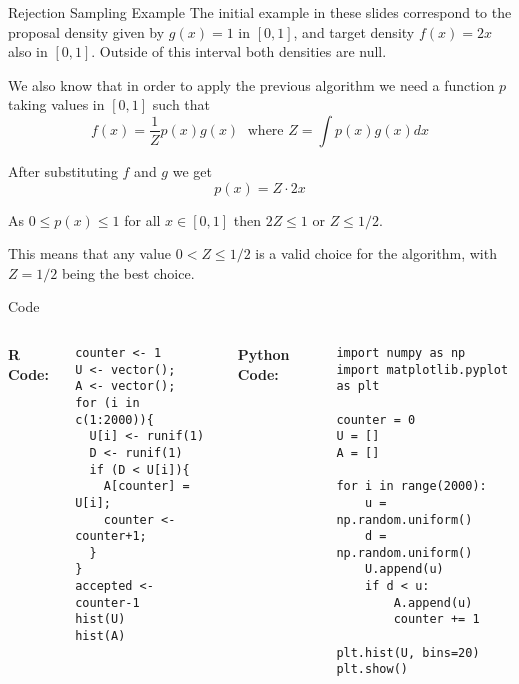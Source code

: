 \documentclass[8pt]{beamer}
\begin{document}
\begin{frame}{Rejection Sampling Example}
The initial example in these slides correspond to the proposal density given by $g(x)=1$ in $[0,1]$, and target density $f(x)=2x$ also in $[0,1]$. Outside of this interval both densities are null.

\vspace{2mm} 

We also know that in order to apply the previous algorithm we need a function $p$ taking values in $[0,1]$ such that 
\begin{equation*}
f(x)=\frac{1}{Z}p(x)g(x)  \; \text{ where } Z=\int p(x) g(x) dx
\end{equation*}

After substituting $f$ and $g$ we get
\begin{equation*}
p(x)=Z\cdot2x
\end{equation*}

As $0\leq p(x) \leq 1$ for all $x \in [0,1]$ then $2Z \leq 1$ or $Z \leq 1/2$.

\vspace{2mm}

This means that any value $0<Z\leq 1/2$ is a valid choice for the algorithm, with $Z=1/2$ being the best choice.
\end{frame}


\begin{frame}[fragile]
\alert{Code}

\vspace{2mm}

\begin{columns}
{\bf R Code:}
\begin{lstlisting}
counter <- 1
U <- vector();
A <- vector();
for (i in c(1:2000)){ 
  U[i] <- runif(1)
  D <- runif(1)
  if (D < U[i]){
    A[counter] = U[i];
    counter <- counter+1;
  }
}
accepted <- counter-1
hist(U)
hist(A)
\end{lstlisting}

{\bf Python Code:}
\begin{lstlisting}
import numpy as np
import matplotlib.pyplot as plt

counter = 0
U = []
A = []

for i in range(2000):
    u = np.random.uniform()
    d = np.random.uniform()
    U.append(u)
    if d < u:
        A.append(u)
        counter += 1

plt.hist(U, bins=20)
plt.show()

\end{lstlisting}
\end{columns}
\end{frame}
\end{document}
